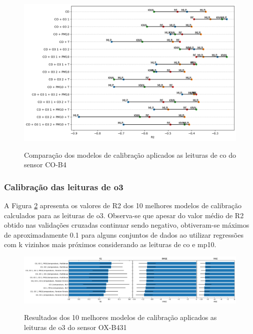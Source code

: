 \begin{figure}[h]
    \centering
    \caption{Comparação dos modelos de calibração aplicados as leituras de \acrshort{co} do sensor CO-B4}
    \includegraphics[width=\textwidth]{chapters/3-RESULTADOS CAMPO/Figuras/co-all-models-comparison.png}
    \label{fig:data-co-all-models-comparison}
\end{figure}

\subsubsection{Calibração das leituras de \acrshort{o3}}

A Figura \ref{fig:data-o3-all-models-performance} apresenta os valores de R2 dos 10 melhores modelos de calibração calculados para as leituras de \acrshort{o3}. Observa-se que apesar do valor médio de R2 obtido nas validações cruzadas continuar sendo negativo, obtiveram-se máximos de aproximadamente 0.1 para alguns conjuntos de dados ao utilizar regressões com k vizinhos mais próximos considerando as leituras de \acrshort{co} e \acrshort{mp10}.

\begin{figure}[h]
    \centering
    \caption{Resultados dos 10 melhores modelos de calibração aplicados as leituras de \acrshort{o3} do sensor OX-B431}
    \includegraphics[width=\textwidth]{chapters/3-RESULTADOS CAMPO/Figuras/o3-all-models-performance.png}
    \label{fig:data-o3-all-models-performance}
\end{figure}

